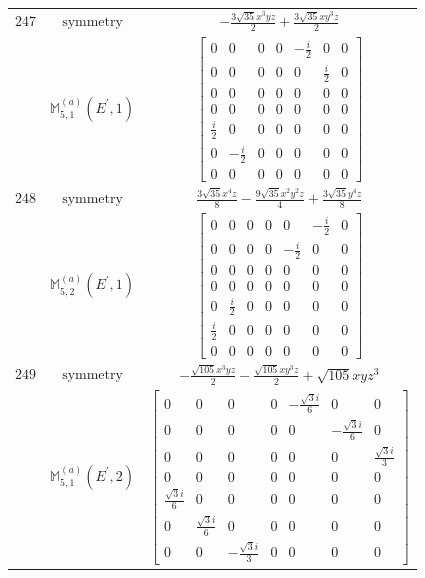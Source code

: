 \documentclass[fleqn,8pt,landscape]{jsarticle}
\begin{document}
\begin{longtable}{ccc}
$ 247 $ & $ \text{symmetry} $ & $ - \frac{3 \sqrt{35} x^{3} y z}{2} + \frac{3 \sqrt{35} x y^{3} z}{2} $ \\
$  $ & $ \mathbb{M}_{5,1}^{(a)}(E^{\prime},1) $ & $ \begin{bmatrix} 0 & 0 & 0 & 0 & - \frac{i}{2} & 0 & 0 \\ 0 & 0 & 0 & 0 & 0 & \frac{i}{2} & 0 \\ 0 & 0 & 0 & 0 & 0 & 0 & 0 \\ 0 & 0 & 0 & 0 & 0 & 0 & 0 \\ \frac{i}{2} & 0 & 0 & 0 & 0 & 0 & 0 \\ 0 & - \frac{i}{2} & 0 & 0 & 0 & 0 & 0 \\ 0 & 0 & 0 & 0 & 0 & 0 & 0 \end{bmatrix} $ \\ \hline
$ 248 $ & $ \text{symmetry} $ & $ \frac{3 \sqrt{35} x^{4} z}{8} - \frac{9 \sqrt{35} x^{2} y^{2} z}{4} + \frac{3 \sqrt{35} y^{4} z}{8} $ \\
$  $ & $ \mathbb{M}_{5,2}^{(a)}(E^{\prime},1) $ & $ \begin{bmatrix} 0 & 0 & 0 & 0 & 0 & - \frac{i}{2} & 0 \\ 0 & 0 & 0 & 0 & - \frac{i}{2} & 0 & 0 \\ 0 & 0 & 0 & 0 & 0 & 0 & 0 \\ 0 & 0 & 0 & 0 & 0 & 0 & 0 \\ 0 & \frac{i}{2} & 0 & 0 & 0 & 0 & 0 \\ \frac{i}{2} & 0 & 0 & 0 & 0 & 0 & 0 \\ 0 & 0 & 0 & 0 & 0 & 0 & 0 \end{bmatrix} $ \\ \hline
$ 249 $ & $ \text{symmetry} $ & $ - \frac{\sqrt{105} x^{3} y z}{2} - \frac{\sqrt{105} x y^{3} z}{2} + \sqrt{105} x y z^{3} $ \\
$  $ & $ \mathbb{M}_{5,1}^{(a)}(E^{\prime},2) $ & $ \begin{bmatrix} 0 & 0 & 0 & 0 & - \frac{\sqrt{3} i}{6} & 0 & 0 \\ 0 & 0 & 0 & 0 & 0 & - \frac{\sqrt{3} i}{6} & 0 \\ 0 & 0 & 0 & 0 & 0 & 0 & \frac{\sqrt{3} i}{3} \\ 0 & 0 & 0 & 0 & 0 & 0 & 0 \\ \frac{\sqrt{3} i}{6} & 0 & 0 & 0 & 0 & 0 & 0 \\ 0 & \frac{\sqrt{3} i}{6} & 0 & 0 & 0 & 0 & 0 \\ 0 & 0 & - \frac{\sqrt{3} i}{3} & 0 & 0 & 0 & 0 \end{bmatrix} $ \\ \hline

\end{longtable}
\end{document}
